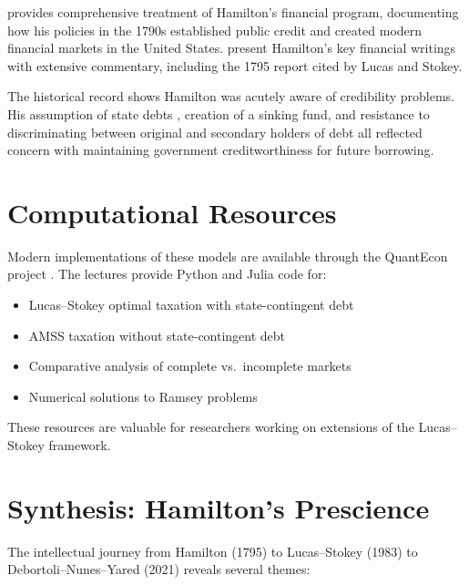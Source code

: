 \documentclass[12pt]{article}
\begin{document}
\citet{sylla_2009, sylla_2009_nber} provides comprehensive treatment of Hamilton's financial program, documenting how his policies in the 1790s established public credit and created modern financial markets in the United States. \citet{cowen_sylla_2018} present Hamilton's key financial writings with extensive commentary, including the 1795 report cited by Lucas and Stokey.

The historical record shows Hamilton was acutely aware of credibility problems. His assumption of state debts \citep{hamilton_1790_first}, creation of a sinking fund, and resistance to discriminating between original and secondary holders of debt all reflected concern with maintaining government creditworthiness for future borrowing.

\section{Computational Resources}

Modern implementations of these models are available through the QuantEcon project \citep{quantecon_amss}. The lectures provide Python and Julia code for:
\begin{itemize}[noitemsep]
\item Lucas--Stokey optimal taxation with state-contingent debt
\item AMSS taxation without state-contingent debt  
\item Comparative analysis of complete vs.\ incomplete markets
\item Numerical solutions to Ramsey problems
\end{itemize}

These resources are valuable for researchers working on extensions of the Lucas--Stokey framework.

\section{Synthesis: Hamilton's Prescience}

The intellectual journey from Hamilton (1795) to Lucas--Stokey (1983) to Debortoli--Nunes--Yared (2021) reveals several themes:
\end{document}

